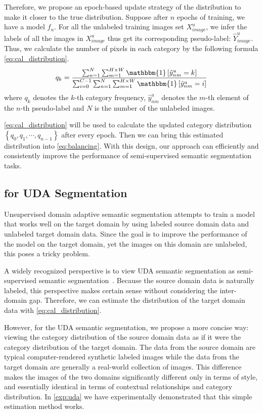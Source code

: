 %
Therefore, we propose an epoch-based update strategy of the distribution to make it closer to the true distribution.
%
Suppose after $n$ epochs of training, we have a model $f_{n}$. 
%
For all the unlabeled training images set $X^{u}_{image}$, we infer the labels of all the images in $X^{u}_{image}$ thus get its corresponding pseudo-label: $\hat{Y}^{u}_{image}$.
%
Thus, we calculate the number of pixels in each category by the following formula \cref{eq:cal_distribution}.
\begin{equation}\label{eq:cal_distribution}
    q_{k} = \frac{\sum_{n=1}^{N}\sum_{m=1}^{H\times W}\mathbbm{1}\left[\hat{y}_{nm}^u = k\right]}{\sum_{i=0}^{C-1}\sum_{n=1}^{N}\sum_{m=1}^{H\times W}\mathbbm{1}\left[\hat{y}_{nm}^u = i\right]}
\end{equation}
where $q_{k}$ denotes the $k$-th category frequency, $\hat{y}_{nm}^u$ denotes the $m$-th element of the $n$-th pseudo-label and $N$ is the number of the unlabeled images.

%
\cref{eq:cal_distribution} will be used to calculate the updated category distribution $\left\{q_{0}, q_{1},\cdots,q_{n-1}\right\}$ after every epoch.
%
Then we can bring this estimated distribution into \cref{eq:balancing}.
%
With this design, our approach can efficiently and consistently improve the performance of semi-supervised semantic segmentation tasks.

\subsection{\method for UDA Segmentation}\label{sec:method_4}
Unsupervised domain adaptive semantic segmentation attempts to train a model that works well on the target domain by using labeled source domain data and unlabeled target domain data.
%
Since the goal is to improve the performance of the model on the target domain, yet the images on this domain are unlabeled, this poses a tricky problem.
%

%
A widely recognized perspective is to view UDA semantic segmentation as semi-supervised semantic segmentation~\cite{zhang2021prototypical}.
%
Because the source domain data is naturally labeled, this perspective makes certain sense without considering the inter-domain gap.
%
Therefore, we can estimate the distribution of the target domain data with \cref{eq:cal_distribution}.
%

%
However, for the UDA semantic segmentation, we propose a more concise way: viewing the category distribution of the source domain data as if it were the category distribution of the target domain.
%
The data from the source domain are typical computer-rendered synthetic labeled images while the data from the target domain are generally a real-world collection of images.
%
This difference makes the images of the two domains significantly different only in terms of style, and essentially identical in terms of contextual relationships and category distribution.
%
In \cref{exp:uda} we have experimentally demonstrated that this simple estimation method works.

